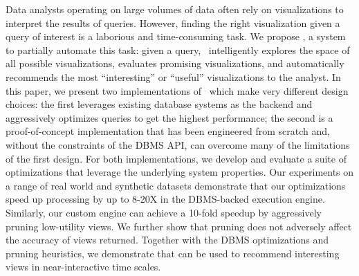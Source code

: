 

Data analysts operating on large volumes of data often rely on visualizations to
interpret the results of queries.
However, finding the right visualization given a query of interest is a
laborious and time-consuming task.
We propose \VizRecDB, a system to partially automate this task:
given a query, \VizRecDB\ intelligently explores the space of all possible
visualizations, evaluates promising visualizations, and automatically recommends
the most ``interesting'' or ``useful'' visualizations to the analyst.
In this paper, we present two implementations of \VizRecDB\ which make very
different design choices: the first leverages existing database systems as the
backend and aggressively optimizes queries to get the highest performance; the
second is a proof-of-concept implementation that has been engineered from
scratch and, without the constraints of the DBMS API, can overcome many of the
limitations of the first design.
For both implementations, we develop and evaluate a suite of optimizations that
leverage the underlying system properties.
Our experiments on a range of real world and synthetic datasets demonstrate
that our optimizations speed up processing by up to 8-20X in the DBMS-backed
execution engine.
Similarly, our custom engine can achieve a 10-fold speedup by aggressively
pruning low-utility views. We further show that pruning does not adversely
affect the accuracy of views returned.
Together with the DBMS optimizations and pruning heuristics, we demonstrate that
\VizRecDB can be used to recommend interesting views in near-interactive time
scales.
